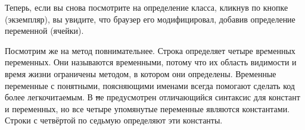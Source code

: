\documentclass[a4paper,10pt,twoside]{book}
\begin{document}
Теперь, если вы снова посмотрите на определение класса, кликнув по кнопке  (экземпляр), вы увидите, что браузер его модифицировал, добавив определение переменной  (ячейки).

Посмотрим же на метод  повнимательнее.
Строка  определяет четыре вр\textit{е}менных переменных. Они называются временными, потому что их область видимости и время жизни ограничены методом, в котором они определены. Временные переменные с понятными, поясняющими именами всегда помогают сделать код более легкочитаемым. В \st не предусмотрен отличающийся синтаксис для констант и переменных, но все четыре упомянутые переменные являются константами.
Строки с четвёртой по седьмую определяют эти константы.
\end{document}
